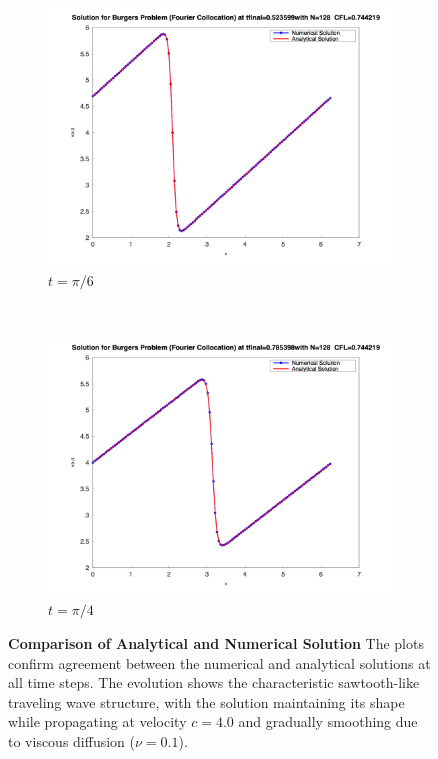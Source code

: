 \begin{figure}[H]
\begin{subfigure}{0.5\textwidth}
		\includegraphics[width=\textwidth]{media/burger_tfinal_fc_128_0.523599.png}
		\caption{$t = \pi / 6$}
		\label{sfig:sublabel3}
	\end{subfigure}%
	~
	\begin{subfigure}{0.5\textwidth}
		\includegraphics[width=\textwidth]{media/burger_tfinal_fc_128_0.785398.png}
		\caption{$t = \pi / 4$}
		\label{sfig:sublabel4}
	\end{subfigure}
	\caption{\textbf{Comparison of Analytical and Numerical Solution}
		The plots confirm agreement between the numerical and analytical solutions at all time steps. The evolution shows the characteristic sawtooth-like traveling wave structure, with the solution maintaining its shape while propagating at velocity $c = 4.0$ and gradually smoothing due to viscous diffusion ($\nu = 0.1$). 
	}
	\label{fig:figureLabel}
\end{figure}

